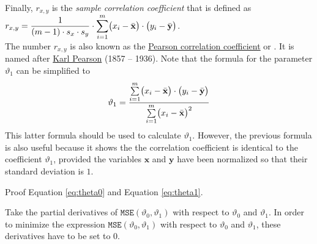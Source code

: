 Finally, $r_{x,y}$ is the \emph{\color{blue}sample correlation coefficient} that is defined as
\\[0.2cm]
\hspace*{1.3cm}
$\displaystyle r_{x,y} = \frac{1}{(m-1) \cdot s_x \cdot s_y} \cdot \sum\limits_{i=1}^m \bigl(x_i - \bar{\mathbf{x}}\bigr) \cdot \bigl(y_i - \bar{\mathbf{y}}\bigr)$.
\\[0.2cm]
The number $r_{x,y}$ is also known as the
\href{https://en.wikipedia.org/wiki/Pearson_correlation_coefficient}{Pearson correlation coefficient} or
.  It is named after \href{https://en.wikipedia.org/wiki/Karl_Pearson}{Karl Pearson}
(1857 -- 1936).
Note that the formula for the parameter $\vartheta_1$ can be simplified to  
\begin{equation}
  \label{eq:theta1}
\displaystyle\vartheta_1 = \frac{\sum\limits_{i=1}^m \bigl(x_i - \bar{\mathbf{x}}\bigr) \cdot \bigl(y_i - \bar{\mathbf{y}}\bigr)}{
                        \sum\limits_{i=1}^m \bigl(x_i - \bar{\mathbf{x}}\bigr)^2}  
\end{equation}
This latter formula should be used to calculate $\vartheta_1$.  However, the previous formula is also useful
because it shows the the correlation coefficient is identical to the coefficient $\vartheta_1$, provided the variables $\mathbf{x}$ and
$\mathbf{y}$ have been normalized so that their standard deviation is $1$.

\exercise
Proof Equation \ref{eq:theta0} and Equation \ref{eq:theta1}.

\hint
Take the partial derivatives of $\mathtt{MSE}(\vartheta_0, \vartheta_1)$ with respect to $\vartheta_0$ and
$\vartheta_1$.  In order to minimize the expression  $\mathtt{MSE}(\vartheta_0, \vartheta_1)$ with respect to
$\vartheta_0$ and $\vartheta_1$, these derivatives have to be set to $0$.
\eox


